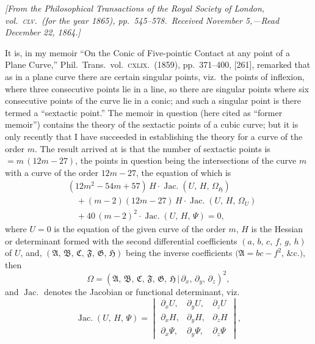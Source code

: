 \documentclass[11pt,a4paper]{article}
\providecommand{\mid}{\,|\,}
\providecommand{\Jac}{\operatorname{Jac.}}
\begin{document}
\begin{center}
\textit{[From the Philosophical Transactions of the Royal Society of London, vol.\ \textsc{clv}.\ (for the year 1865), pp.\ 545--578.\ Received November 5,---Read December 22, 1864.]}
\end{center}

\medskip

It is, in my memoir ``On the Conic of Five-pointic Contact at any point of a Plane Curve,'' Phil.\ Trans.\ vol.\ \textsc{cxlix}.\ (1859), pp.\ 371--400, [261], remarked that as in a plane curve there are certain singular points, viz.\ the points of inflexion, where three consecutive points lie in a line, so there are singular points where six consecutive points of the curve lie in a conic; and such a singular point is there termed a ``sextactic point.'' The memoir in question (here cited as ``former memoir'') contains the theory of the sextactic points of a cubic curve; but it is only recently that I have succeeded in establishing the theory for a curve of the order $m$. The result arrived at is that the number of sextactic points is $= m\,(12m - 27)$, the points in question being the intersections of the curve $m$ with a curve of the order $12m - 27$, the equation of which is
\[
\begin{aligned}
&(12m^{2} - 54m + 57)\,H \cdot \Jac(U,\,H,\,\Omega_{\mathfrak{H}})\\
&\quad + (m - 2)(12m - 27)\,H \cdot \Jac(U,\,H,\,\Omega_{U})\\
&\quad + 40\,(m - 2)^{2} \cdot \Jac(U,\,H,\,\Psi) = 0,
\end{aligned}
\]
where $U = 0$ is the equation of the given curve of the order $m$, $H$ is the Hessian or determinant formed with the second differential coefficients $(a,\,b,\,c,\,f,\,g,\,h)$ of $U$, and, $(\mathfrak{A},\,\mathfrak{B},\,\mathfrak{C},\,\mathfrak{F},\,\mathfrak{G},\,\mathfrak{H})$ being the inverse coefficients $(\mathfrak{A} = bc - f^{2}$, \&c.$)$, then
\[
\Omega = (\mathfrak{A},\,\mathfrak{B},\,\mathfrak{C},\,\mathfrak{F},\,\mathfrak{G},\,\mathfrak{H}\mid \partial_{x},\,\partial_{y},\,\partial_{z})^{2},
\]
and $\Jac$ denotes the Jacobian or functional determinant, viz.
\[
\Jac(U,\,H,\,\Psi) = \begin{vmatrix}
\partial_{x}U, & \partial_{y}U, & \partial_{z}U \\
\partial_{x}H, & \partial_{y}H, & \partial_{z}H \\
\partial_{x}\Psi, & \partial_{y}\Psi, & \partial_{z}\Psi
\end{vmatrix},
\]
\end{document}
